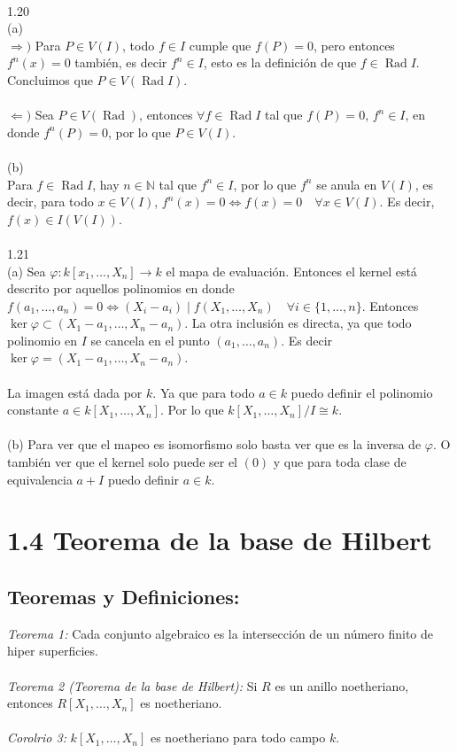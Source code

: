 \documentclass{article}
\begin{document}
\\
1.20
\\
(a)
\\
$\Longrightarrow)$ Para $P \in V(I)$, todo $f \in I$ cumple que $f(P)=0$, pero entonces $f^n(x)=0$ también, es decir $f^{n} \in I$, esto es la definición de que $f \in \operatorname{Rad}{I}$. Concluimos que $P \in V(\operatorname{Rad}{I})$.
\\
\\
$\Longleftarrow)$ Sea $P \in V(\operatorname{Rad})$, entonces $\forall f \in \operatorname{Rad}{I}$ tal que $f(P)=0$, $f^n \in I$, en donde $f^n(P)=0$, por lo que $P \in V(I)$.
\\
\\
(b)
\\
Para $f \in \operatorname{Rad}{I}$, hay $n \in \mathbb{N}$ tal que $f^n \in I$, por lo que $f^n$ se anula en $V(I)$, es decir, para todo $x \in V(I)$, $f^n(x)=0 \Longleftrightarrow f(x)=0 \quad \forall x \in V(I)$. Es decir, $f(x) \in I(V(I))$. 
\\
\\
1.21
\\
(a) Sea $\varphi: k[x_1, \dots, X_n] \to k$ el mapa de evaluación. Entonces el kernel está descrito por aquellos polinomios en donde $f(a_1, \dots, a_n)=0 \Longleftrightarrow (X_i - a_i) \mid f(X_1, \dots , X_n) \quad \forall i \in \{ 1, \dots, n\}$. Entonces $\ker{\varphi} \subset (X_1 - a_1, \dots, X_n - a_n)$. La otra inclusión es directa, ya que todo polinomio en $I$ se cancela en el punto $(a_1, \dots, a_n)$. Es decir $\ker{\varphi}=(X_1 - a_1, \dots, X_n - a_n)$.
\\
\\
La imagen está dada por $k$. Ya que para todo $a \in k$ puedo definir el polinomio constante $a \in k[X_1, \dots, X_n]$. Por lo que $k[X_1, \dots , X_n]/I \cong k$.
\\
\\
(b) Para ver que el mapeo es isomorfismo solo basta ver que es la inversa de $\varphi$. O también ver que el kernel solo puede ser el $(0)$ y que para toda clase de equivalencia $a + I$ puedo definir $a \in k$.
\section*{1.4 Teorema de la base de Hilbert}
\subsection*{Teoremas y Definiciones:}
\textit{Teorema 1:} Cada conjunto algebraico es la intersección de un número finito de hiper superficies.
\\
\\
\textit{Teorema 2 (Teorema de la base de Hilbert):} Si $R$ es un anillo noetheriano, entonces $R[X_1, \dots, X_n]$ es noetheriano.
\\
\\
\textit{Corolrio 3:} $k[X_1, \dots, X_n]$ es noetheriano para todo campo $k$.
\end{document}
